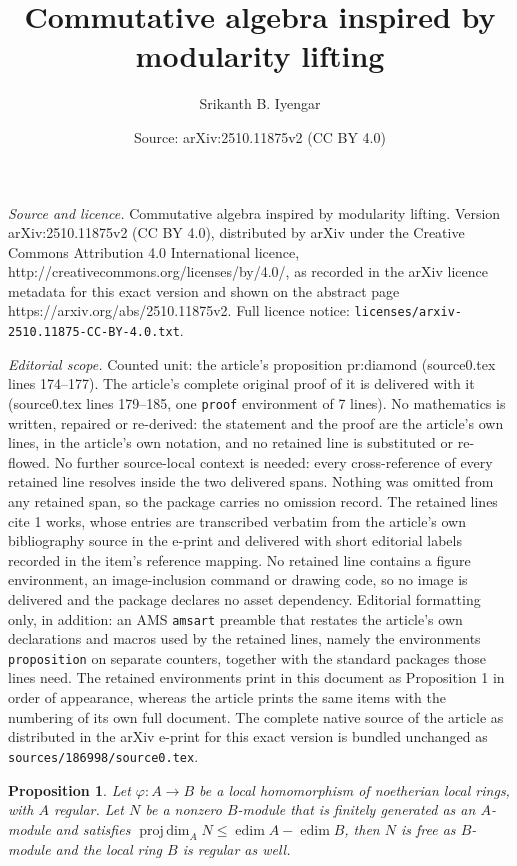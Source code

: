 \documentclass[10pt,a4paper]{amsart}
\title{\Large Commutative algebra inspired by modularity lifting}
\author{Srikanth B. Iyengar}
\date{Source: arXiv:2510.11875v2 (CC BY 4.0)}
\newtheorem{proposition}{Proposition}
\newcommand{\edim}{\operatorname{edim}}
\newcommand{\pdim}{\operatorname{proj\,dim}}
\begin{document}
\maketitle

\noindent\emph{Source and licence.} \Large Commutative algebra inspired by modularity lifting. Version arXiv:2510.11875v2 (CC BY 4.0), distributed by arXiv under the Creative Commons Attribution 4.0 International licence, http://creativecommons.org/licenses/by/4.0/, as recorded in the arXiv licence metadata for this exact version and shown on the abstract page https://arxiv.org/abs/2510.11875v2. Full licence notice: \texttt{licenses/arxiv-2510.11875-CC-BY-4.0.txt}.\par\smallskip

\noindent\textit{Editorial scope.} Counted unit: the article's proposition pr:diamond (source0.tex lines 174--177). The article's complete original proof of it is delivered with it (source0.tex lines 179--185, one \texttt{proof} environment of 7 lines). No mathematics is written, repaired or re-derived: the statement and the proof are the article's own lines, in the article's own notation, and no retained line is substituted or re-flowed.  No further source-local context is needed: every cross-reference of every retained line resolves inside the two delivered spans.  Nothing was omitted from any retained span, so the package carries no omission record.  The retained lines cite 1 works, whose entries are transcribed verbatim from the article's own bibliography source in the e-print and delivered with short editorial labels recorded in the item's reference mapping.  No retained line contains a figure environment, an image-inclusion command or drawing code, so no image is delivered and the package declares no asset dependency.  Editorial formatting only, in addition: an AMS \texttt{amsart} preamble that restates the article's own declarations and macros used by the retained lines, namely the environments \texttt{proposition} on separate counters, together with the standard packages those lines need.  The retained environments print in this document as Proposition 1 in order of appearance, whereas the article prints the same items with the numbering of its own full document.  The complete native source of the article as distributed in the arXiv e-print for this exact version is bundled unchanged as \texttt{sources/186998/source0.tex}.
\begin{proposition}
\label{pr:diamond}
Let $\varphi\colon A\to B$ be a local homomorphism of noetherian local rings, with $A$ regular. Let $N$ be a nonzero $B$-module that is finitely generated as an $A$-module and satisfies $\pdim_AN\le \edim A-\edim B$, then $N$ is free as $B$-module and the local ring $B$ is regular as well.
\end{proposition}
\end{document}
